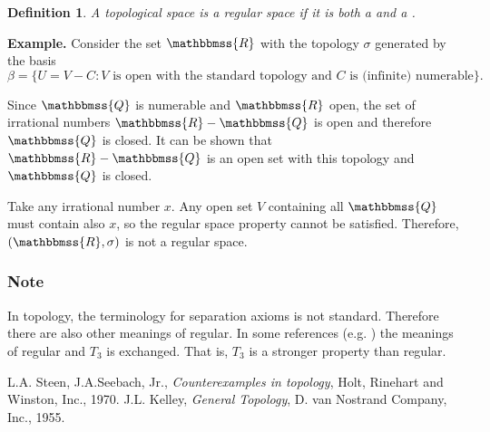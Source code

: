 \documentclass{article}
\newcommand{\R}{\mathbbmss{R}}
\newcommand{\Q}{\mathbbmss{Q}}
\newtheorem{defn}{Definition}
\begin{document}
\begin{defn}
A topological space is a \emph{regular space} if
 it is both a  and a 
 .
\end{defn}

{\bf Example.}
Consider the set $\R$ with the topology $\sigma$ generated  by the basis $$\beta=\{ U=V-C: V \mbox{ is open with the standard topology and\ } C \mbox{ is (infinite) numerable}\}.$$

Since $\Q$ is numerable and $\R$ open, the set of irrational numbers $\R-\Q$ is open and therefore $\Q$ is closed.
It can be shown that $\R-\Q$ is an open set with this topology and $\Q$ is closed. 

Take any irrational number $x$. Any open set $V$  containing all $\Q$ must contain also $x$, so the regular space property cannot be satisfied. Therefore, $(\R,\sigma)$ is not a regular space.

\subsubsection*{Note}
In topology, the terminology for separation axioms is not
standard. Therefore there are also other meanings of regular. 
In some references (e.g. \cite{kelley})
the meanings of regular and $T_3$ is exchanged. That is, 
$T_3$ is a stronger property than regular. 

 \begin{thebibliography}{9}
  L.A. Steen, J.A.Seebach, Jr.,
 \emph{Counterexamples in topology},
 Holt, Rinehart and Winston, Inc., 1970.
J.L. Kelley, \emph{General Topology}, D. van Nostrand Company, Inc., 1955.

 \end{thebibliography}
\end{document}
